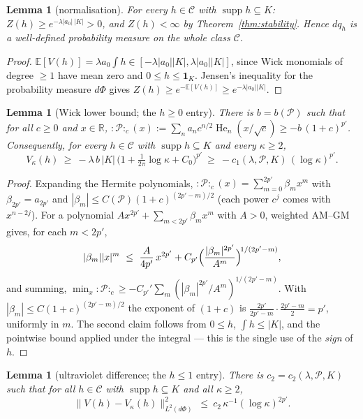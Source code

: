 \documentclass[11pt,a4paper]{article}
\theoremstyle{plain}
\newtheorem{lemma}[theorem]{Lemma}
\theoremstyle{definition}
\newcommand{\R}{\mathbb{R}}
\newcommand{\E}{\mathbb{E}}
\DeclareMathOperator{\supp}{supp}
\DeclareMathOperator{\He}{He}
\begin{document}
\begin{lemma}[normalisation]\label{lem:Z}
For every $h\in\mathcal C$ with $\supp h\subseteq K$:
$Z(h)\ge e^{-\lambda|a_0|\,|K|}>0$, and $Z(h)<\infty$ by Theorem~\ref{thm:stability}. Hence
$dq_h$ is a well-defined probability measure on the whole class $\mathcal C$.
\end{lemma}

\begin{proof}
$\E[V(h)]=\lambda a_0\int h\in[-\lambda|a_0||K|,\lambda|a_0||K|]$, since Wick monomials of
degree $\ge1$ have mean zero and $0\le h\le\mathbf 1_K$. Jensen's inequality for the probability
measure $d\Phi$ gives $Z(h)\ge e^{-\E[V(h)]}\ge e^{-\lambda|a_0||K|}$.
\end{proof}

\begin{lemma}[Wick lower bound; the $h\ge0$ entry]\label{lem:wick}
There is $b=b(\mathscr P)$ such that for all $c\ge0$ and $x\in\R$,
${:}\mathscr P{:}_c(x):=\sum_na_nc^{n/2}\He_n(x/\sqrt c)\ge-b\,(1+c)^{p'}$. Consequently, for
every $h\in\mathcal C$ with $\supp h\subseteq K$ and every $\kappa\ge2$,
\[
  V_\kappa(h)\ \ge\ -\lambda\,b\,|K|\,\bigl(1+\tfrac1{2\pi}\log\kappa+C_0\bigr)^{p'}
  \ \ge\ -c_1(\lambda,\mathscr P,K)\,(\log\kappa)^{p'} .
\]
\end{lemma}

\begin{proof}
Expanding the Hermite polynomials, ${:}\mathscr P{:}_c(x)=\sum_{m=0}^{2p'}\beta_mx^m$ with
$\beta_{2p'}=a_{2p'}$ and $|\beta_m|\le C(\mathscr P)(1+c)^{(2p'-m)/2}$ (each power $c^j$ comes
with $x^{n-2j}$). For a polynomial $Ax^{2p'}+\sum_{m<2p'}\beta_mx^m$ with $A>0$, weighted
AM--GM gives, for each $m<2p'$,
\[
  |\beta_m||x|^m\ \le\ \frac{A}{4p'}\,x^{2p'}
  +C_{p'}\Bigl(\frac{|\beta_m|^{2p'}}{A^{m}}\Bigr)^{\!1/(2p'-m)},
\]
and summing, $\min_x{:}\mathscr P{:}_c\ge-C_{p'}'\sum_m(|\beta_m|^{2p'}/A^m)^{1/(2p'-m)}$. With
$|\beta_m|\le C(1+c)^{(2p'-m)/2}$ the exponent of $(1+c)$ is
$\frac{2p'}{2p'-m}\cdot\frac{2p'-m}{2}=p'$, uniformly in $m$. The second claim follows from
$0\le h$, $\int h\le|K|$, and the pointwise bound applied under the integral --- this is the
single use of the \emph{sign} of $h$.
\end{proof}

\begin{lemma}[ultraviolet difference; the $h\le1$ entry]\label{lem:uv}
There is $c_2=c_2(\lambda,\mathscr P,K)$ such that for all $h\in\mathcal C$ with
$\supp h\subseteq K$ and all $\kappa\ge2$,
\[
  \bigl\|V(h)-V_\kappa(h)\bigr\|_{L^2(d\Phi)}^2\ \le\ c_2\,\kappa^{-1}(\log\kappa)^{2p'} .
\]
\end{lemma}
\end{document}
